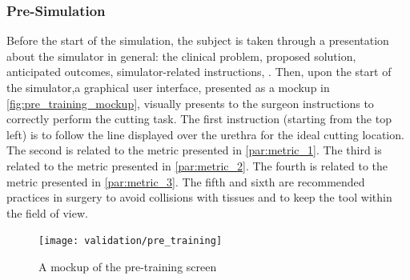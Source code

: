 \subsubsection{Pre-Simulation}
Before the start of the simulation, the subject is taken through a presentation about the simulator in general: the clinical problem, proposed solution, anticipated outcomes, simulator-related instructions, \etc. Then, upon the start of the simulator,a graphical user interface, presented as a mockup in \autoref{fig:pre_training_mockup}, visually presents to the surgeon instructions to correctly perform the cutting task. The first instruction (starting from the top left) is to follow the line displayed over the urethra for the ideal cutting location. The second is related to the metric presented in \autoref{par:metric_1}. The third is related to the metric presented in \autoref{par:metric_2}. The fourth is related to the metric presented in \autoref{par:metric_3}. The fifth and sixth are recommended practices in surgery to avoid collisions with tissues and to keep the tool within the field of view.
\begin{figure}
  \centering%
  \texttt{[image: validation/pre\_training]}
  \caption{A mockup of the pre-training screen}\label{fig:pre_training_mockup}
\end{figure}

